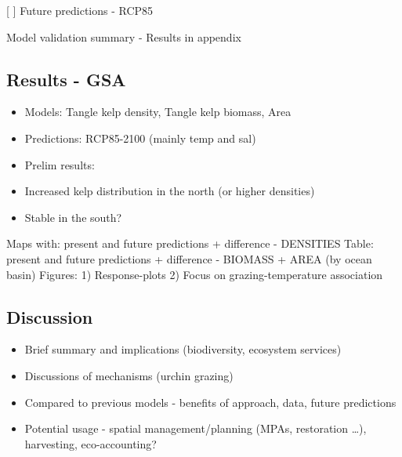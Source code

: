 \documentclass[
]{article}
\providecommand{\tightlist}{%
  \setlength{\itemsep}{0pt}\setlength{\parskip}{0pt}}
\begin{document}
{[} {]} Future predictions - RCP85

Model validation summary - Results in appendix

\hypertarget{results---gsa}{%
\subsection{Results - GSA}\label{results---gsa}}

\begin{itemize}
\tightlist
\item
  Models: Tangle kelp density, Tangle kelp biomass, Area
\item
  Predictions: RCP85-2100 (mainly temp and sal)
\item
  Prelim results:
\item
  Increased kelp distribution in the north (or higher densities)
\item
  Stable in the south?
\end{itemize}

Maps with: present and future predictions + difference - DENSITIES
Table: present and future predictions + difference - BIOMASS + AREA (by
ocean basin) Figures: 1) Response-plots 2) Focus on grazing-temperature
association

\hypertarget{discussion}{%
\subsection{Discussion}\label{discussion}}

\begin{itemize}
\tightlist
\item
  Brief summary and implications (biodiversity, ecosystem services)
\item
  Discussions of mechanisms (urchin grazing)
\item
  Compared to previous models - benefits of approach, data, future
  predictions
\item
  Potential usage - spatial management/planning (MPAs, restoration
  \ldots), harvesting, eco-accounting?
\end{itemize}
\end{document}
